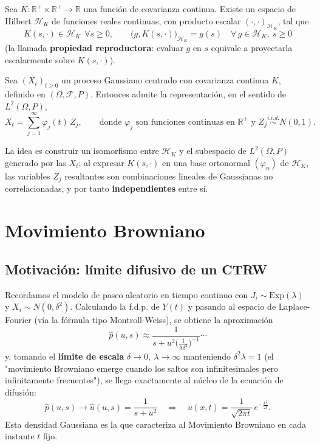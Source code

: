 \begin{teo}
Sea $K:\mathbb{R}^+\times\mathbb{R}^+\to\mathbb{R}$ una función de covarianza continua. Existe un espacio de Hilbert $\mathcal{H}_K$ de funciones reales continuas, con producto escalar $(\cdot,\cdot)_{\mathcal{H}_K}$, tal que
\[
K(s,\cdot)\in\mathcal{H}_K\ \ \forall s\ge0, \qquad \big(g,K(s,\cdot)\big)_{\mathcal{H}_K} = g(s) \quad \forall\, g\in\mathcal{H}_K,\ s\ge0
\]
(la llamada \textbf{propiedad reproductora}: evaluar $g$ en $s$ equivale a proyectarla escalarmente sobre $K(s,\cdot)$).
\end{teo}

\begin{teo}
Sea $(X_t)_{t\ge0}$ un proceso Gaussiano centrado con covarianza continua $K$, definido en $(\Omega,\mathcal{F},P)$. Entonces admite la representación, en el sentido de $L^2(\Omega,P)$,
\[
X_t = \sum_{j=1}^{\infty} \varphi_j(t)\, Z_j, \qquad \text{donde } \varphi_j \text{ son funciones continuas en } \mathbb{R}^+ \text{ y } Z_j\overset{i.i.d.}{\sim} N(0,1).
\]
\end{teo}
\begin{observacion}
La idea es construir un isomorfismo entre $\mathcal{H}_K$ y el subespacio de $L^2(\Omega,P)$ generado por las $X_t$; al expresar $K(s,\cdot)$ en una base ortonormal $(\varphi_n)$ de $\mathcal{H}_K$, las variables $Z_j$ resultantes son combinaciones lineales de Gaussianas no correlacionadas, y por tanto \textbf{independientes} entre sí.
\end{observacion}

\section{Movimiento Browniano}

\subsection{Motivación: límite difusivo de un CTRW}

\noindent
Recordamos el modelo de paseo aleatorio en tiempo continuo con $J_i\sim\text{Exp}(\lambda)$ y $X_i\sim N(0,\delta^2)$. Calculando la f.d.p. de $Y(t)$ y pasando al espacio de Laplace-Fourier (vía la fórmula tipo Montroll-Weiss), se obtiene la aproximación
\[
\widehat{p}(u,s) \approx \frac{1}{s+u^2\big(\tfrac{1}{\lambda\delta^2}\big)^{-1}}\cdots
\]
y, tomando el \textbf{límite de escala} $\delta\to0,\ \lambda\to\infty$ manteniendo $\delta^2\lambda=1$ (el "movimiento Browniano emerge cuando los saltos son infinitesimales pero infinitamente frecuentes"), se llega exactamente al núcleo de la ecuación de difusión:
\[
\widehat p(u,s) \longrightarrow \widehat u(u,s) = \frac{1}{s+u^2} \quad\Longrightarrow\quad u(x,t) = \frac{1}{\sqrt{2\pi t}}\, e^{-\frac{x^2}{2t}}.
\]
Esta densidad Gaussiana es la que caracteriza al Movimiento Browniano en cada instante $t$ fijo.

